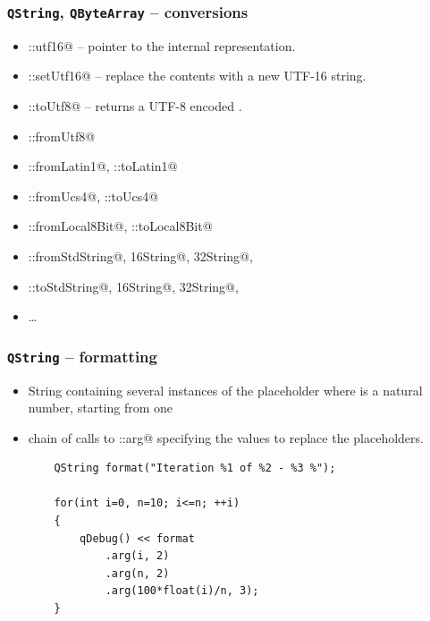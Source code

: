 \begin{frame}[fragile]
  \frametitle{\texttt{QString}, \texttt{QByteArray} -- conversions}
  \small
  \begin{itemize}
    \item \verb@QString::utf16@ -- pointer to the internal representation.
    \item \verb@QString::setUtf16@ -- replace the contents with a new UTF-16 string.
    \item \verb@QString::toUtf8@ -- returns a UTF-8 encoded \verb@QByteArray@.
    \item \verb@QString::fromUtf8@
    \item \verb@QString::fromLatin1@, \verb@QString::toLatin1@
    \item \verb@QString::fromUcs4@, \verb@QString::toUcs4@
    \item \verb@QString::fromLocal8Bit@, \verb@QString::toLocal8Bit@
    \item \verb@QString::fromStdString@, \verb@fromStdU16String@,
    \verb@fromStdU32String@, \verb@fromStdWString@
    \item \verb@QString::toStdString@, \verb@toStdU16String@,
    \verb@toStdU32String@, \verb@toStdWString@
    \item \ldots
  \end{itemize}
\end{frame}

\begin{frame}[fragile]
  \frametitle{\texttt{QString} -- formatting}
  \begin{itemize}
    \item String containing several instances of the placeholder \verb@%N@,
    where \verb@N@ is a natural number, starting from one
    \item chain of calls to \verb@QString::arg@ specifying the values
    to replace the placeholders.
    \begin{lstlisting}
	QString format("Iteration %1 of %2 - %3 %");

	for(int i=0, n=10; i<=n; ++i)
	{
	    qDebug() << format
	        .arg(i, 2)
	        .arg(n, 2)
	        .arg(100*float(i)/n, 3);
	}
    \end{lstlisting}
  \end{itemize}
\end{frame}

